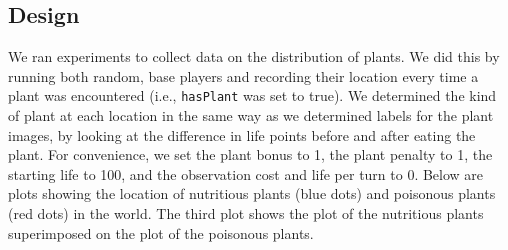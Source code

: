 \documentclass[solution, letterpaper]{cs121}
\begin{document}
\subsection{Design}
We ran experiments to collect data on the distribution of plants. We did this by running both random, base players and recording their location every time a plant was encountered (i.e., {\tt hasPlant} was set to true). We determined the kind of plant at each location in the same way as we determined labels for the plant images, by looking at the difference in life points before and after eating the plant. For convenience, we set the plant bonus to 1, the plant penalty to 1, the starting life to 100, and the observation cost and life per turn to 0. Below are plots showing the location of nutritious plants (blue dots) and poisonous plants (red dots) in the world. The third plot shows the plot of the nutritious plants superimposed on the plot of the poisonous plants.
\end{document}
